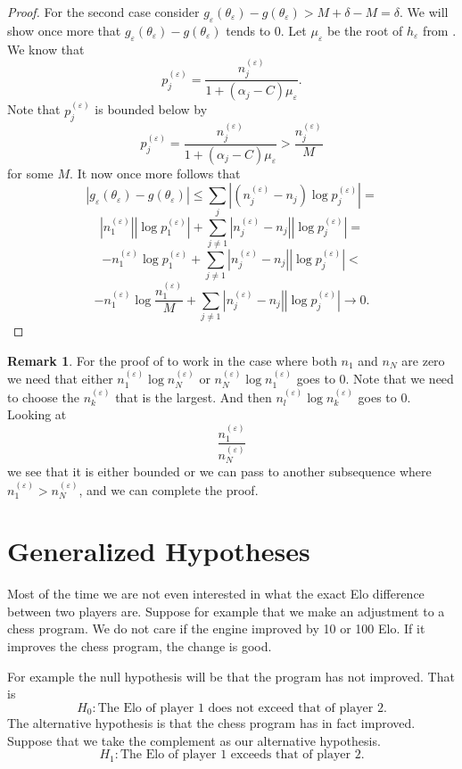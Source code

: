 \documentclass{article}
\theoremstyle{plain}
\theoremstyle{definition}
\newtheorem{remark}      {\bf Remark}      [section]
\begin{document}
\begin{proof}
	For the second case consider
	$g_\varepsilon(\theta_\varepsilon)-g(\theta_\varepsilon)>M+\delta-M=\delta$.
	We will show once more that $g_\varepsilon(\theta_\varepsilon)-
	g(\theta_\varepsilon)$ tends to $0$. Let $\mu_\varepsilon$ be the root of
	$h_\varepsilon$ from . We know that
	$$p^{(\varepsilon)}_j=\frac{n^{(\varepsilon)}_j}{1+(\alpha_j-C)\mu_\varepsilon}.$$
	Note that $p^{(\varepsilon)}_j$ is bounded below by
	$$p^{(\varepsilon)}_j=\frac{n^{(\varepsilon)}_j}{1+(\alpha_j-C)\mu_\varepsilon}
	>\frac{n^{(\varepsilon)}_j}M$$ for some $M$. It now once more follows that
	$$|g_\varepsilon(\theta_\varepsilon)-g(\theta_\varepsilon)|\leq
	\sum_j |(n^{(\varepsilon)}_j-n_j)\log p^{(\varepsilon)}_j|=$$$$
	|n^{(\varepsilon)}_1||\log p^{(\varepsilon)}_1|+
	\sum_{j\neq1} |n^{(\varepsilon)}_j-n_j||\log p^{(\varepsilon)}_j|=$$$$
	-n^{(\varepsilon)}_1\log p^{(\varepsilon)}_1+
	\sum_{j\neq1} |n^{(\varepsilon)}_j-n_j||\log p^{(\varepsilon)}_j|<$$$$
	-n^{(\varepsilon)}_1\log\frac{n^{(\varepsilon)}_1}{M}+
	\sum_{j\neq1} |n^{(\varepsilon)}_j-n_j||\log p^{(\varepsilon)}_j|\to0.$$
\end{proof}
\begin{remark}
	For the proof of  to work in the case where both
	$n_1$ and $n_N$ are zero we need that either $n^{(\varepsilon)}_1\log
	n^{(\varepsilon)}_N$ or $n^{(\varepsilon)}_N\log
	n^{(\varepsilon)}_1$ goes to $0$. Note that we need to choose the
	$n^{(\varepsilon)}_k$ that is the largest. And then $n^{(\varepsilon)}
	_l\log n^{(\varepsilon)}_k$ goes to $0$. Looking at $$\frac{n^{(\varepsilon)}_1}
	{n^{(\varepsilon)}_N}$$ we see that it is either bounded or we can pass
	to another subsequence where $n^{(\varepsilon)}_1>n^{(\varepsilon)}_N$,
	and we can complete the proof.
\end{remark}

\section{Generalized Hypotheses}
Most of the time we are not even interested in what the exact Elo difference between
two players are. Suppose for example that we make an adjustment to a chess program.
We do not care if the engine improved by 10 or 100 Elo. If it improves the chess program,
the change is good.

For example the null hypothesis will be that the program has not improved. That is
$$H_0:\text{The Elo of player $1$ does not exceed that of player $2$.}$$
The alternative hypothesis is that the chess program has in fact improved. Suppose
that we take the complement as our alternative hypothesis.
$$H_1:\text{The Elo of player $1$ exceeds that of player $2$.}$$
\end{document}
